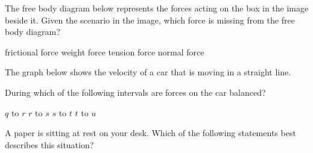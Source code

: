 \documentclass[answers]{exam}
\begin{document}
\begin{questions}

\question %
The free body diagram below represents the forces acting on the box in the image beside it. Given the scenario in the image, which force is missing from the free body diagram?

\begin{randomizechoices}[norandomize]
    \correctchoice frictional force
    \choice weight force
    \choice tension force
    \choice normal force    
\end{randomizechoices}


\question
The graph below shows the velocity of a car that is moving in a straight line.

\begin{center}
\end{center}

During which of the following intervals are forces on the car balanced?

\begin{randomizeoneparchoices}[norandomize]
    \choice $q$ to $r$
    \choice $r$ to $s$
    \correctchoice $s$ to $t$
    \choice $t$ to $u$
\end{randomizeoneparchoices}

\question 
A paper is sitting at rest on your desk.  Which of the following statements best describes this situation?


\end{questions}
\end{document}
